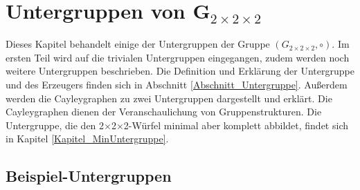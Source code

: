 \documentclass[12pt,a4paper, usenames, dvipsnames]{article}
\theoremstyle{mystyle}
\theoremstyle{definition}
\newcommand{\Gtwo}{\ensuremath{G_{2\times 2\times 2}}}
\newcommand{\Ttwo}{2$\times$2$\times$2-}
\begin{document}
\section{Untergruppen von G$_{2\times 2\times 2}$}

\label{Kapitel_Untergruppen}

Dieses Kapitel behandelt einige der Untergruppen der Gruppe $(\Gtwo, \circ)$. Im ersten Teil wird auf die trivialen Untergruppen eingegangen, zudem werden noch weitere Untergruppen beschrieben.
Die Definition und Erklärung der Untergruppe und des Erzeugers finden sich in Abschnitt \ref{Abschnitt_Untergruppe}.
Außerdem werden die Cayleygraphen zu zwei Untergruppen dargestellt und erklärt. Die Cayleygraphen dienen der Veranschaulichung von Gruppenstrukturen. Die Untergruppe, die den \Ttwo Würfel minimal aber komplett abbildet, findet sich in Kapitel \ref{Kapitel_MinUntergruppe}.

%
%
%
%
%
%
%
%
%
%
%
%
%
%
%
%
%
%
%
%
\subsection{Beispiel-Untergruppen}

\label{Abschnitt_UntergruppenBeispiele}
\end{document}
